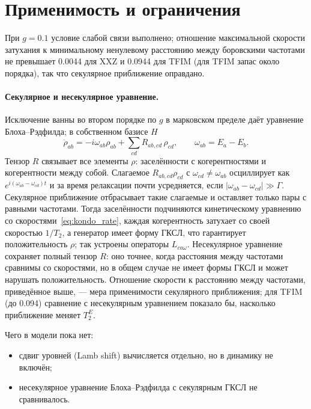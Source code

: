 \section{Применимость и ограничения}
При $g=0.1$ условие слабой связи выполнено; отношение максимальной скорости
затухания к минимальному ненулевому расстоянию между боровскими частотами не
превышает 0.0044 для XXZ и 0.0944 для TFIM (для TFIM запас около порядка),
так что секулярное приближение оправдано.

\paragraph{Секулярное и несекулярное уравнение.} Исключение ванны во втором
порядке по $g$ в марковском пределе даёт уравнение Блоха--Рэдфилда; в
собственном базисе $H$
\[
 \dot\rho_{ab}=-i\omega_{ab}\rho_{ab}+\sum_{cd}R_{ab,cd}\,\rho_{cd},\qquad
 \omega_{ab}=E_a-E_b .
\]
Тензор $R$ связывает все элементы $\rho$: заселённости с когерентностями и
когерентности между собой. Слагаемое $R_{ab,cd}\rho_{cd}$ с
$\omega_{cd}\ne\omega_{ab}$ осциллирует как $e^{i(\omega_{ab}-\omega_{cd})t}$ и
за время релаксации почти усредняется, если $|\omega_{ab}-\omega_{cd}|\gg\Gamma$.
Секулярное приближение отбрасывает такие слагаемые и оставляет только пары с
равными частотами. Тогда заселённости подчиняются кинетическому уравнению со
скоростями~\eqref{eq:kondo_rate}, каждая когерентность затухает со своей
скоростью $1/T_2$, а генератор имеет форму ГКСЛ, что гарантирует
положительность $\rho$; так устроены операторы $L_{ca\omega}$. Несекулярное
уравнение сохраняет полный тензор $R$: оно точнее, когда расстояния между
частотами сравнимы со скоростями, но в общем случае не имеет формы ГКСЛ и может
нарушать положительность. Отношение скорости к расстоянию между частотами,
приведённое выше, --- мера применимости секулярного приближения; для TFIM
(до 0.094) сравнение с несекулярным уравнением показало бы, насколько
приближение меняет $T_2^E$.

Чего в модели пока нет:
\begin{itemize}
\item сдвиг уровней (Lamb shift) вычисляется отдельно, но в динамику не
  включён;
\item несекулярное уравнение Блоха--Рэдфилда с секулярным ГКСЛ не сравнивалось.
\end{itemize}



